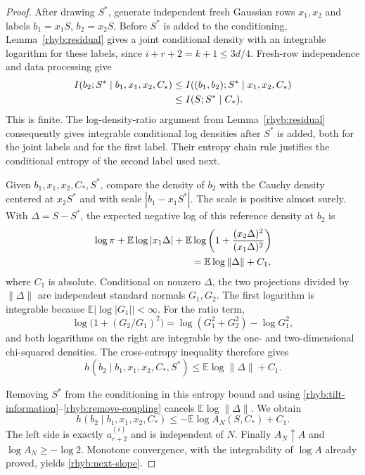 \begin{proof}
After drawing \(S^*\), generate independent fresh Gaussian rows
\(x_1,x_2\) and labels \(b_1=x_1S\), \(b_2=x_2S\).
Before \(S^*\) is added to the conditioning,
Lemma~\ref{rhyb:residual} gives a joint conditional density with an
integrable logarithm for these labels, since
\(i+r+2=k+1\le3d/4\).  Fresh-row independence and data processing give
\begin{align}
 I(b_2;S^*\mid b_1,x_1,x_2,C_*)
 &\le I((b_1,b_2);S^*\mid x_1,x_2,C_*)\notag\\
 &\le I(S;S^*\mid C_*).\label{rhyb:remove-coupling}
\end{align}
This is finite.  The log-density-ratio argument from
Lemma~\ref{rhyb:residual} consequently gives integrable conditional log
densities after \(S^*\) is added, both for the joint labels and for the
first label.  Their entropy chain rule justifies the conditional entropy
of the second label used next.

Given \(b_1,x_1,x_2,C_*,S^*\), compare the density of \(b_2\) with the Cauchy
density centered at \(x_2S^*\) and with scale
\(|b_1-x_1S^*|\).  The scale is positive almost surely.  With
\(\Delta=S-S^*\), the expected negative log of this reference density
at \(b_2\) is
\begin{align}
 &\log\pi+\mathbb E\log|x_1\Delta|
 +\mathbb E\log\left(1+\frac{(x_2\Delta)^2}{(x_1\Delta)^2}\right)
 \notag\\
 &\hspace{35mm}=\mathbb E\log\|\Delta\|+C_1,\label{rhyb:cauchy}
\end{align}
where \(C_1\) is absolute.  Conditional on nonzero \(\Delta\), the two
projections divided by \(\|\Delta\|\) are independent standard normals
\(G_1,G_2\).  The first logarithm is integrable because
\(\mathbb E|\log|G_1||<\infty\).  For the ratio term,
\[
 \log\bigl(1+(G_2/G_1)^2\bigr)
 =\log(G_1^2+G_2^2)-\log G_1^2,
\]
and both logarithms on the right are integrable by the one- and
two-dimensional chi-squared densities.  The cross-entropy inequality
therefore gives
\[
 h(b_2\mid b_1,x_1,x_2,C_*,S^*)
 \le\mathbb E\log\|\Delta\|+C_1.
\]

Removing \(S^*\) from the conditioning in this entropy bound and using
\eqref{rhyb:tilt-information}--\eqref{rhyb:remove-coupling} cancels
\(\mathbb E\log\|\Delta\|\).  We obtain
\[
 h(b_2\mid b_1,x_1,x_2,C_*)\le-\mathbb E\log A_N(S,C_*)+C_1.
\]
The left side is exactly \(a_{r+2}^{(i)}\) and is independent of \(N\).
Finally \(A_N\uparrow A\) and \(\log A_N\ge-\log2\).
Monotone convergence, with the integrability of \(\log A\) already
proved, yields \eqref{rhyb:next-slope}.
\end{proof}

